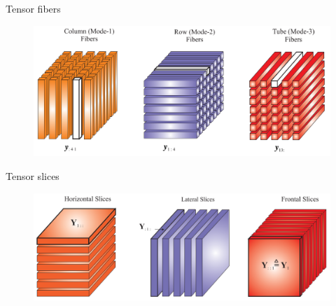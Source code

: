 \documentclass[t, 10pt, handout, aspectratio=169]{beamer}
\begin{document}
\begin{frame}{Tensor fibers}
\begin{figure}
	\centering  
	\includegraphics[width=\linewidth]{figs/tensor_fibers}
	\label{fig:tensor_fibers}
\end{figure}
\end{frame}

\begin{frame}{Tensor slices}
\begin{figure}
	\centering  
	\includegraphics[width=\linewidth]{figs/tensor_slices}
	\label{fig:tensor_slices}
\end{figure}
\end{frame}
\end{document}
